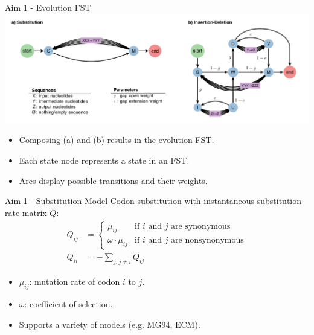 \documentclass{beamer}
\begin{document}
\begin{frame}{Aim 1 - Evolution FST} %
\includegraphics[scale=0.6,center]{fig-evolution-fst.pdf}
\begin{itemize}
	\item Composing (a) and (b) results in the evolution FST.
	\item Each state node represents a state in an FST.
	\item Arcs display possible transitions and their weights.
\end{itemize}
\end{frame} %

\begin{frame}{Aim 1 - Substitution Model} %
Codon substitution with instantaneous substitution rate matrix $Q$:
\vspace{1em}
\begin{align*} Q_{ij} &= \begin{cases}
    \mu_{ij} & \text{if $i$ and $j$ are synonymous}\\
    \omega \cdot \mu_{ij} & \text{if $i$ and $j$ are nonsynonymous}
    \end{cases}\\[10pt]
   Q_{ii} &= -\sum_{j:j \neq i} Q_{ij}
\end{align*}
\begin{itemize}
	\item $\mu_{ij}$: mutation rate of codon $i$ to $j$.
	\item $\omega$: coefficient of selection.
	\item Supports a variety of models (e.g.
		MG94\parencite{muse_gaut_1994}, ECM\parencite{kosiol_ECM_2007}).
\end{itemize}
\end{frame} %
\end{document}
